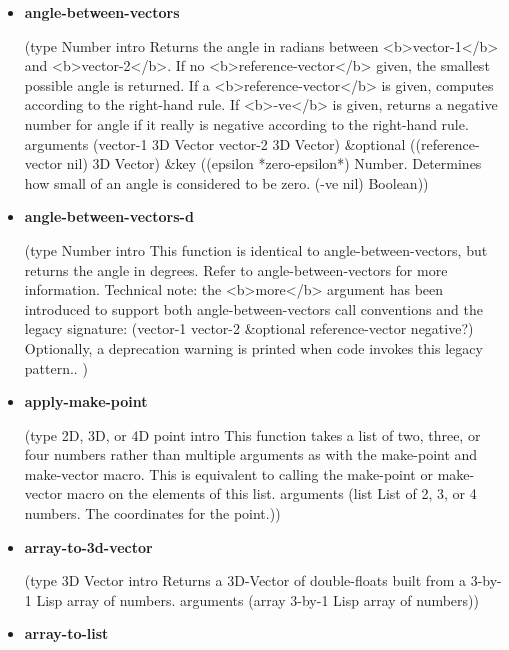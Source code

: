 \documentclass [11pt]{book}
\begin{document}
\begin{itemize}
\item {}
\label{prim:angle-between-vectors}
\textbf{angle-between-vectors}

(type Number intro
  Returns the angle in radians between <b>vector-1</b> and <b>vector-2</b>.
If no <b>reference-vector</b> given, the smallest possible angle is returned.
If a <b>reference-vector</b> is given, computes according to the right-hand rule.
If <b>-ve</b> is given,  returns a negative number for angle if it really is
negative according to the right-hand rule.
 arguments (vector-1 3D Vector vector-2 3D Vector) \&optional
 ((reference-vector nil) 3D Vector) \&key
 ((epsilon *zero-epsilon*)
  Number. Determines how small of an angle is considered to be zero.
  (-ve nil) Boolean))



\item {}
\label{prim:angle-between-vectors-d}
\textbf{angle-between-vectors-d}

(type Number intro
  This function is identical to angle-between-vectors, but returns the angle in degrees.
Refer to angle-between-vectors for more information.
Technical note: the <b>more</b> argument has been introduced to support both
angle-between-vectors call conventions and the legacy signature:
(vector-1 vector-2 \&optional reference-vector negative?)
Optionally, a deprecation warning is printed when code invokes this legacy pattern..
)



\item {}
\label{prim:apply-make-point}
\textbf{apply-make-point}

(type 2D, 3D, or 4D point intro
  This function takes a list of two, three, or four numbers rather
than multiple arguments as with the make-point and make-vector macro. This is equivalent
to calling the make-point or make-vector macro on the elements of this list.
 arguments
 (list List of 2, 3, or 4 numbers. The coordinates for the point.))



\item {}
\label{prim:array-to-3d-vector}
\textbf{array-to-3d-vector}

(type 3D Vector intro
  Returns a 3D-Vector of double-floats built from a 3-by-1 Lisp array of numbers.
 arguments (array 3-by-1 Lisp array of numbers))



\item {}
\label{prim:array-to-list}
\textbf{array-to-list}


\end{itemize}
\end{document}
